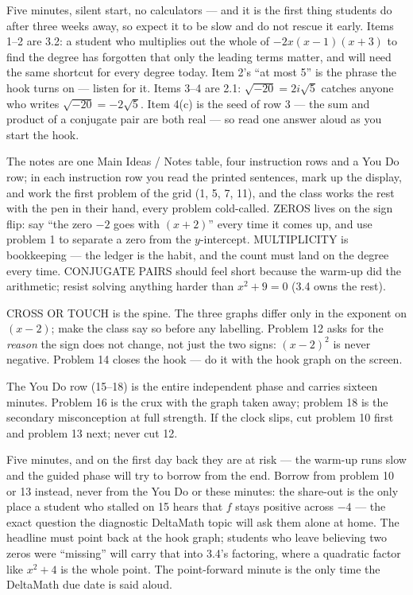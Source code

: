 \documentclass[10pt]{article}
\begin{document}
\begin{teachernote}[Warm-Up]
Five minutes, silent start, no calculators --- and it is the first thing students do after
three weeks away, so expect it to be slow and do not rescue it early. Items 1--2 are 3.2: a
student who multiplies out the whole of $-2x(x - 1)(x + 3)$ to find the degree has forgotten
that only the leading terms matter, and will need the same shortcut for every degree today.
Item 2's ``at most 5'' is the phrase the hook turns on --- listen for it. Items 3--4 are 2.1:
$\sqrt{-20} = 2i\sqrt{5}$ catches anyone who writes $\sqrt{-20} = -2\sqrt{5}$. Item 4(c) is
the seed of row 3 --- the sum and product of a conjugate pair are both real --- so read one
answer aloud as you start the hook.
\end{teachernote}

\begin{teachernote}
The notes are one Main Ideas / Notes table, four instruction rows and a You Do row; in each
instruction row you read the printed sentences, mark up the display, and work the first
problem of the grid (1, 5, 7, 11), and the class works the rest with the pen in their hand,
every problem cold-called. ZEROS lives on the sign flip: say ``the zero $-2$ goes with
$(x + 2)$'' every time it comes up, and use problem 1 to separate a zero from the
$y$-intercept. MULTIPLICITY is bookkeeping --- the ledger is the habit, and the count must
land on the degree every time. CONJUGATE PAIRS should feel short because the warm-up did the
arithmetic; resist solving anything harder than $x^2 + 9 = 0$ (3.4 owns the rest).

CROSS OR TOUCH is the spine. The three graphs differ only in the exponent on $(x - 2)$; make
the class say so before any labelling. Problem 12 asks for the \emph{reason} the sign does not
change, not just the two signs: $(x - 2)^2$ is never negative. Problem 14 closes the hook ---
do it with the hook graph on the screen.

The You Do row (15--18) is the entire independent phase and carries sixteen minutes. Problem
16 is the crux with the graph taken away; problem 18 is the secondary misconception at full
strength. If the clock slips, cut problem 10 first and problem 13 next; never cut 12.
\end{teachernote}

\begin{teachernote}[Debrief]
Five minutes, and on the first day back they are at risk --- the warm-up runs slow and the
guided phase will try to borrow from the end. Borrow from problem 10 or 13 instead, never from
the You Do or these minutes: the share-out is the only place a student who stalled on 15 hears
that $f$ stays positive across $-4$ --- the exact question the diagnostic DeltaMath topic will
ask them alone at home. The headline must point back at the hook graph; students who leave
believing two zeros were ``missing'' will carry that into 3.4's factoring, where a quadratic
factor like $x^2 + 4$ is the whole point. The point-forward minute is the only time the
DeltaMath due date is said aloud.
\end{teachernote}
\end{document}
